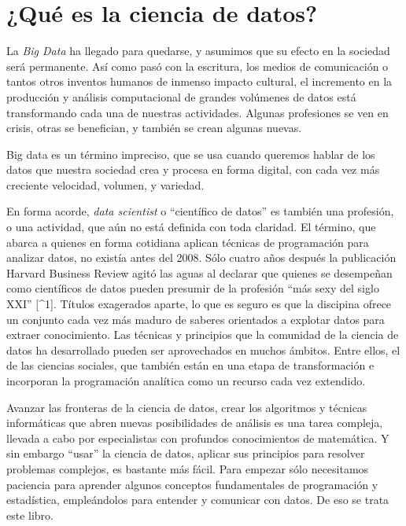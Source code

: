 \documentclass[]{book}
\begin{document}
\chapter{¿Qué es la ciencia de datos?}\label{que-es-la-ciencia-de-datos}

La \emph{Big Data} ha llegado para quedarse, y asumimos que su efecto en
la sociedad será permanente. Así como pasó con la escritura, los medios
de comunicación o tantos otros inventos humanos de inmenso impacto
cultural, el incremento en la producción y análisis computacional de
grandes volúmenes de datos está transformando cada una de nuestras
actividades. Algunas profesiones se ven en crisis, otras se benefician,
y también se crean algunas nuevas.

Big data es un término impreciso, que se usa cuando queremos hablar de
los datos que nuestra sociedad crea y procesa en forma digital, con cada
vez más creciente velocidad, volumen, y variedad.

En forma acorde, \emph{data scientist} o ``científico de datos'' es
también una profesión, o una actividad, que aún no está definida con
toda claridad. El término, que abarca a quienes en forma cotidiana
aplican técnicas de programación para analizar datos, no existía antes
del 2008. Sólo cuatro años después la publicación Harvard Business
Review agitó las aguas al declarar que quienes se desempeñan como
científicos de datos pueden presumir de la profesión ``más sexy del
siglo XXI'' {[}\^{}1{]}. Títulos exagerados aparte, lo que es seguro es
que la discipina ofrece un conjunto cada vez más maduro de saberes
orientados a explotar datos para extraer conocimiento. Las técnicas y
principios que la comunidad de la ciencia de datos ha desarrollado
pueden ser aprovechados en muchos ámbitos. Entre ellos, el de las
ciencias sociales, que también están en una etapa de transformación e
incorporan la programación analítica como un recurso cada vez extendido.

Avanzar las fronteras de la ciencia de datos, crear los algoritmos y
técnicas informáticas que abren nuevas posibilidades de análisis es una
tarea compleja, llevada a cabo por especialistas con profundos
conocimientos de matemática. Y sin embargo ``usar'' la ciencia de datos,
aplicar sus principios para resolver problemas complejos, es bastante
más fácil. Para empezar sólo necesitamos paciencia para aprender algunos
conceptos fundamentales de programación y estadística, empleándolos para
entender y comunicar con datos. De eso se trata este libro.
\end{document}
